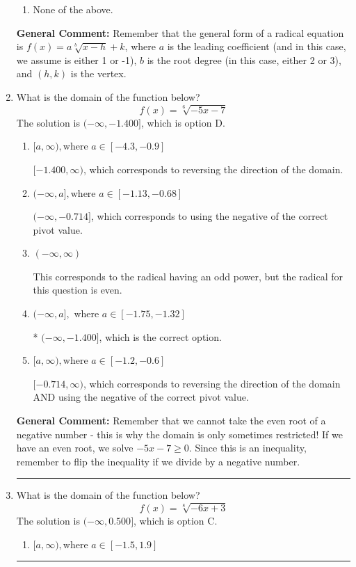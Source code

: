 \documentclass{extbook}[14pt]
\newcommand{\litem}[1]{\item #1

\rule{\textwidth}{0.4pt}}
\begin{document}
\begin{enumerate}
{\begin{enumerate}[label=\Alph*.]
\item None of the above.\end{enumerate}
\textbf{General Comment:} Remember that the general form of a radical equation is $ f(x) = a \sqrt[b]{x - h} + k $, where $a$ is the leading coefficient (and in this case, we assume is either 1 or -1), $b$ is the root degree (in this case, either 2 or 3), and $(h, k)$ is the vertex.
}
\litem{
What is the domain of the function below?
\[ f(x) = \sqrt[6]{-5 x - 7} \]The solution is \( (-\infty, -1.400] \), which is option D.\begin{enumerate}[label=\Alph*.]
\item \( [a, \infty), \text{where } a \in [-4.3, -0.9] \)

 $[-1.400, \infty)$, which corresponds to reversing the direction of the domain.
\item \( (-\infty, a], \text{where } a \in [-1.13, -0.68] \)

$(-\infty, -0.714]$, which corresponds to using the negative of the correct pivot value.
\item \( (-\infty, \infty) \)

This corresponds to the radical having an odd power, but the radical for this question is even.
\item \( (-\infty, a], \text{ where } a \in [-1.75, -1.32] \)

* $(-\infty, -1.400]$, which is the correct option.
\item \( [a, \infty), \text{where } a \in [-1.2, -0.6] \)

$[-0.714, \infty)$, which corresponds to reversing the direction of the domain AND using the negative of the correct pivot value.
\end{enumerate}

\textbf{General Comment:} Remember that we cannot take the even root of a negative number - this is why the domain is only sometimes restricted! If we have an even root, we solve $-5 x - 7 \geq 0$. Since this is an inequality, remember to flip the inequality if we divide by a negative number.
}
\litem{
What is the domain of the function below?
\[ f(x) = \sqrt[8]{-6 x + 3} \]The solution is \( (-\infty, 0.500] \), which is option C.\begin{enumerate}[label=\Alph*.]
\item \( [a, \infty), \text{where } a \in [-1.5, 1.9] \)


\end{enumerate}}
\end{enumerate}
\end{document}
